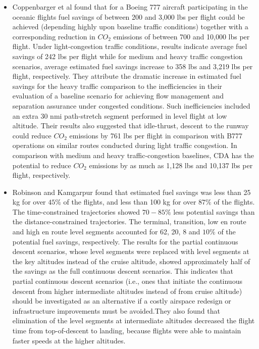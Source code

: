 \documentclass{aer1315-pretty}
\begin{document}
\begin{itemize}
\item Coppenbarger et al \cite{Copp:2007} found that for a Boeing 777 aircraft participating in the oceanic flights fuel savings of between 200 and 3,000 lbs per flight could be achieved (depending highly upon baseline traffic conditions) together with a corresponding reduction in $CO_2$ emissions of between 700 and 10,000 lbs per flight. Under light-congestion traffic conditions, results indicate average fuel savings of 242 lbs per flight while for medium and heavy traffic congestion scenarios, average estimated fuel savings increase to 358 lbs and 3,219 lbs per flight, respectively. They attribute the dramatic increase in estimated fuel savings for the heavy traffic comparison to the inefficiencies in their evaluation of a baseline scenario for achieving flow management and separation assurance under congested conditions. Such inefficiencies included an extra 30 nmi path-stretch segment performed in level flight at low altitude. Their results also suggested that idle-thrust, descent to the runway could reduce $CO_2$ emissions by 761 lbs per flight in comparison with B777 operations on similar routes conducted during light traffic congestion. In comparison with medium and heavy traffic-congestion baselines, CDA has the potential to reduce $CO_2$ emissions by as much as 1,128 lbs and 10,137 lbs per flight, respectively. 


\item Robinson and Kamgarpur \cite{Rob:2010} found that estimated fuel savings was less than 25 kg for over $45\%$ of the flights, and less than 100 kg for over $87\%$ of the flights. The time-constrained trajectories showed $70-85\%$ less potential savings than the distance-constrained trajectories.  The terminal, transition, low en route and high en route level segments accounted for 62, 20, 8 and $10\%$ of the potential fuel savings, respectively.  The results for the partial continuous descent scenarios, whose level segments were replaced with level segments at the key altitudes instead of the cruise altitude, showed approximately half of the savings as the full continuous descent scenarios. This indicates that partial continuous descent scenarios (i.e., ones that initiate the continuous descent from higher intermediate altitudes instead of from cruise altitude) should be investigated as an alternative if a costly airspace redesign or infrastructure improvements must be avoided.They also found that  elimination of the level segments at intermediate altitudes decreased the flight time from top-of-descent to landing, because flights were able to maintain faster speeds at the higher altitudes. 


\end{itemize}
\end{document}

